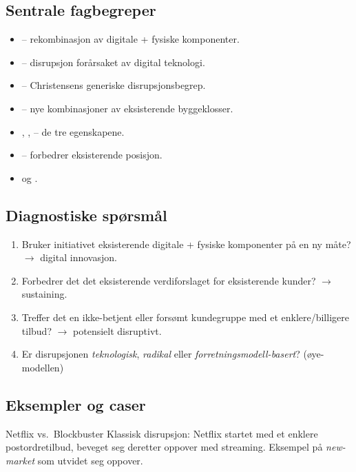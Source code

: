 \subsection{Sentrale fagbegreper}\label{terms:lec05}
\begin{itemize}
  \item {} -- rekombinasjon av digitale + fysiske
    komponenter.
  \item {} -- disrupsjon forårsaket av digital
    teknologi.
  \item {} -- Christensens generiske
    disrupsjonsbegrep.
  \item {} -- nye kombinasjoner av eksisterende byggeklosser.
  \item {}, , 
    -- de tre egenskapene.
  \item {} -- forbedrer eksisterende posisjon.
  \item {} og .
\end{itemize}

\subsection{Diagnostiske spørsmål}
\begin{enumerate}
  \item Bruker initiativet eksisterende digitale + fysiske komponenter på en
    ny måte? $\rightarrow$ digital innovasjon.
  \item Forbedrer det det eksisterende verdiforslaget for eksisterende
    kunder? $\rightarrow$ sustaining.
  \item Treffer det en ikke-betjent eller forsømt kundegruppe med et
    enklere/billigere tilbud? $\rightarrow$ potensielt disruptivt.
  \item Er disrupsjonen \emph{teknologisk}, \emph{radikal} eller
    \emph{forretningsmodell-basert}? (øye-modellen)
\end{enumerate}

\subsection{Eksempler og caser}
\begin{eksempelboks}{Netflix vs.\ Blockbuster}
Klassisk disrupsjon: Netflix startet med et enklere postordretilbud, beveget
seg deretter oppover med streaming. Eksempel på \emph{new-market} som
utvidet seg oppover.
\end{eksempelboks}

